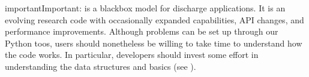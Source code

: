 \documentclass[letterpaper,10pt,english]{sphinxmanual}
\begin{document}
\begin{sphinxadmonition}{important}{Important:}
\sphinxAtStartPar
{} is  a black\sphinxhyphen{}box model for discharge applications.
It is an evolving research code with occasionally expanded capabilities, API changes, and performance improvements.
Although problems can be set up through our Python toos, users should nonetheless be willing to take time to understand how the code works.
In particular, developers should invest some effort in understanding the data structures and  basics (see {\hyperref[\detokenize{Source/ChomboBasics:chap-basics}]{}}).
\end{sphinxadmonition}
\end{document}

